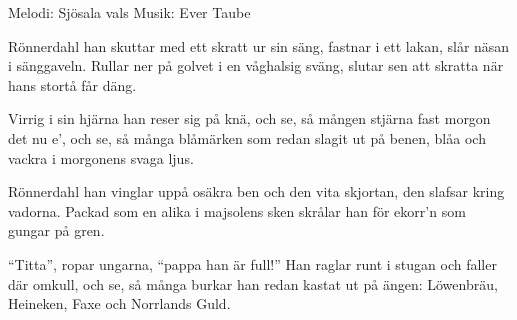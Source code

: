 \begin{song}

\begin{songmeta}
Melodi: Sjösala vals
Musik: Ever Taube
\end{songmeta}

\begin{songtext}
Rönnerdahl han skuttar med ett skratt ur sin säng,
fastnar i ett lakan, slår näsan i sänggaveln.
Rullar ner på golvet i en våghalsig sväng,
slutar sen att skratta när hans stortå får däng.

Virrig i sin hjärna han reser sig på knä,
och se, så mången stjärna fast morgon det nu e',
och se, så många blåmärken som redan slagit ut på benen,
blåa och vackra i morgonens svaga ljus.

Rönnerdahl han vinglar uppå osäkra ben
och den vita skjortan, den slafsar kring vadorna.
Packad som en alika i majsolens sken
skrålar han för ekorr'n som gungar på gren.

\textquotedblleft{}Titta\textquotedblright{}, ropar ungarna, \textquotedblleft{}pappa han är full!\textquotedblright{}
Han raglar runt i stugan och faller där omkull,
och se, så många burkar han redan kastat ut på ängen:
Löwenbräu, Heineken, Faxe och Norrlands Guld.
\end{songtext}
\end{song}
